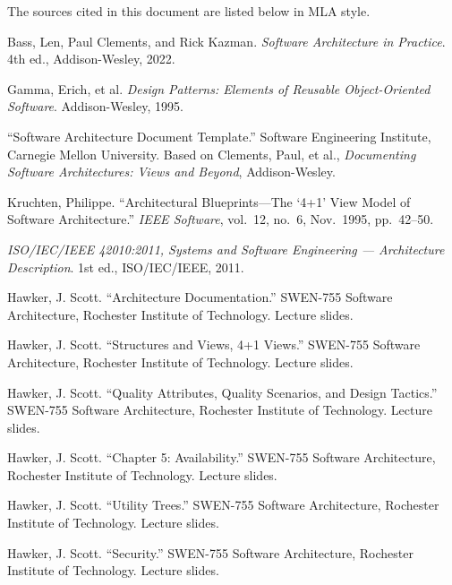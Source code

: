 The sources cited in this document are listed below in MLA style.

\begin{workscited}
\item Bass, Len, Paul Clements, and Rick Kazman. \emph{Software Architecture in Practice}. 4th ed., Addison-Wesley, 2022.

\item Gamma, Erich, et al. \emph{Design Patterns: Elements of Reusable Object-Oriented Software}. Addison-Wesley, 1995.

\item ``Software Architecture Document Template.'' Software Engineering Institute, Carnegie Mellon University. Based on Clements, Paul, et al., \emph{Documenting Software Architectures: Views and Beyond}, Addison-Wesley.

\item Kruchten, Philippe. ``Architectural Blueprints---The `4+1' View Model of Software Architecture.'' \emph{IEEE Software}, vol.~12, no.~6, Nov.\ 1995, pp.~42--50.

\item \emph{ISO/IEC/IEEE 42010:2011, Systems and Software Engineering --- Architecture Description}. 1st ed., ISO/IEC/IEEE, 2011.

\item Hawker, J. Scott. ``Architecture Documentation.'' SWEN-755 Software Architecture, Rochester Institute of Technology. Lecture slides.

\item Hawker, J. Scott. ``Structures and Views, 4+1 Views.'' SWEN-755 Software Architecture, Rochester Institute of Technology. Lecture slides.

\item Hawker, J. Scott. ``Quality Attributes, Quality Scenarios, and Design Tactics.'' SWEN-755 Software Architecture, Rochester Institute of Technology. Lecture slides.

\item Hawker, J. Scott. ``Chapter 5: Availability.'' SWEN-755 Software Architecture, Rochester Institute of Technology. Lecture slides.

\item Hawker, J. Scott. ``Utility Trees.'' SWEN-755 Software Architecture, Rochester Institute of Technology. Lecture slides.

\item Hawker, J. Scott. ``Security.'' SWEN-755 Software Architecture, Rochester Institute of Technology. Lecture slides.
\end{workscited}
